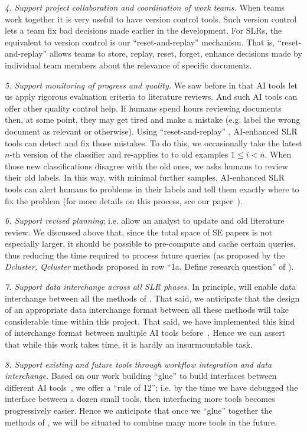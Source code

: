 {\em 4. Support project collaboration and coordination of work teams.}
When teams work together it is very useful to have version control tools.
Such version control lets a team fix bad decisions made earlier in the development.
For SLRs, the equivalent to version control is our ``reset-and-replay'' mechanism.
		That is, ``reset-and-replay'' allows teams to store, replay,  reset, forget, enhance    decisions made by individual team members about the relevance of  specific documents.  

{\em 5. Support monitoring of progress and quality.} 
		We saw before in  that AI tools   let us apply rigorous evaluation criteria to literature reviews. And such AI tools can offer other quality control help.
		If humans spend hours reviewing documents then, at some point, they may get tired and make a mistake (e.g. label the wrong document as relevant or otherwise). Using ``reset-and-replay'' , AI-enhanced SLR tools   can detect and fix those mistakes.    To do this, we occasionally take the  latest $n$-th version of the classifier and re-applies to to old examples $1\le i < n$. When those new classifications disagree with the old ones, we
		asks humans to review their old labels. In this way, with minimal further samples, AI-enhanced
		SLR tools can alert humans to problems in their labels and tell them exactly where to fix the problem (for more details on this process, see our  paper~\cite{Yu2019}). 

{\em 6.  Support revised planning}; i.e. allow an analyst to update and old literature review. We discussed above that, since the total space of SE papers is not especially larger,  
  it should be possible to pre-compute and cache certain queries, thus reducing the time required to process future queries (as proposed by the {\em Dcluster, Qcluster} methods proposed in row ``1a. Define research question''   of ).


{\em 7. Support data interchange across all SLR phases.} In principle, {\IT} will enable data interchange between all the methods of . That said, we anticipate that
		the design of an appropriate data interchange format between all these methods will
		take considerable time within this project. That said, we have implemented this kind
		of interchange format between multiple AI tools before~\cite{xia19}. Hence we can assert
		that while this work takes time, it is hardly an insurmountable task.

{\em 8. Support existing and future tools through workflow integration and data interchange.} Based on our work building ``glue'' to build interfaces between different AI tools~\cite{gay11,xia19}, we offer a ``rule of 12''; i.e. by the time we have debugged the interface between a dozen  small tools,  then interfacing more tools becomes progressively easier. Hence we anticipate that once we ``glue'' together the methods of , we will be situated to combine many more tools in the future.
		
